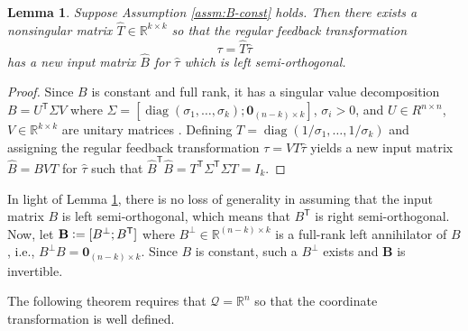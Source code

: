 \documentclass[journal,twoside,web, twocolumn,draftcls]{ieeecolor}
\newtheorem{lemma}{Lemma} %
\DeclareMathOperator{\Diag}{diag}
\newcommand*{\diag}[1]{\Diag\left(#1\right)}
\newcommand*{\tpose}{^\mathsf{T}}
\newcommand*{\R}{\mathbb{R}}
\newcommand*{\Id}[1]{I_{#1}}
\newcommand*{\Zmat}[1]{\bm{0}_{#1}}
\newcommand*{\eqdef}{\vcentcolon=}
\begin{document}
\begin{lemma}\label{lemma:B-orthogonal}
    Suppose Assumption \ref{assm:B-const} holds. Then
    there exists a nonsingular matrix \(\hat{T} \in \R^{k \times k}\) 
    so that the regular feedback transformation 
    \[
        \tau = \hat{T} \hat{\tau}
    \] 
    has a new input matrix \(\hat{B}\) for \(\hat{\tau}\) which is left
    semi-orthogonal.  
\end{lemma}
\begin{proof}
    Since \(B\) is constant and full rank, it has a singular value decomposition 
    \(B = U\tpose \Sigma V\) where 
    \(\Sigma = [\diag{\sigma_1,\ldots,\sigma_k}; \Zmat{(n-k)\times k}]\),
    \(\sigma_i > 0\), and \(U \in R^{n \times n}\),
    \(V \in \R^{k \times k}\) are unitary matrices \cite{calculating_svd}.
    Defining \(T = \diag{1/\sigma_1,\ldots,1/\sigma_k}\) and assigning the
    regular feedback transformation \(\tau = V T \hat{\tau}\) yields a new input
    matrix \(\hat{B} = B V T\) for \(\hat{\tau}\) such that
    \(\hat{B}\tpose \hat{B} = T\tpose \Sigma\tpose \Sigma T = \Id{k}\).
\end{proof}

In light of Lemma \ref{lemma:B-orthogonal}, there is no loss of generality in
assuming that the input matrix \(B\) is left semi-orthogonal, which means that
\(B\tpose\) is right semi-orthogonal.
Now, let \(\mathbf{B} \eqdef [B^\perp; B\tpose]\) where 
\(B^\perp \in \R^{(n-k)\times k}\) is a full-rank left annihilator of \(B\), i.e.,
\(B^\perp B = \Zmat{(n-k) \times k}\).
Since \(B\) is constant, such a \(B^\perp\) exists and
\(\mathbf{B}\) is invertible.

The following theorem requires that \(\mathcal{Q} = \R^n\) so that the
coordinate transformation is well defined.
\end{document}
